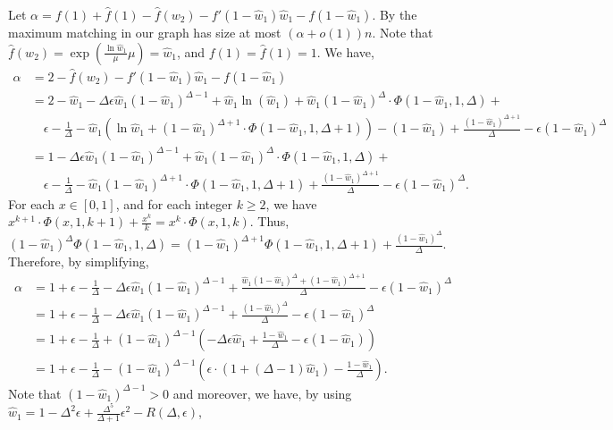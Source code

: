 \documentclass[11pt]{article}
\begin{document}
\begin{appendixproof}
Let $\alpha=f(1)+\hat{f}(1)-\hat{f}(w_2)-f'(1-\hat{w}_1)\hat{w}_1-f(1-\hat{w}_1)$. By  the maximum matching in our graph has size at most $(\alpha+o(1))n$. Note that $\hat{f}(w_2)=\exp\left(\frac{\ln\hat{w}_1}{\mu}\mu\right)=\hat{w}_1$, and $f(1)=\hat{f}(1)=1$. We have,
\begin{align*}
\alpha & = 2 - \hat{f}(w_2) - f'(1-\hat{w}_1)\hat{w}_1 - f(1-\hat{w}_1) \\
& = 2 - \hat{w}_1 - \Delta\epsilon\hat{w}_1(1-\hat{w}_1)^{\Delta-1}+\hat{w}_1\ln(\hat{w}_1) + \hat{w}_1(1-\hat{w}_1)^{\Delta}\cdot \Phi(1-\hat{w}_1,1,\Delta)+\\
&\quad \epsilon-\frac{1}{\Delta} - \hat{w}_1 \left( \ln \hat{w}_1 + (1-\hat{w}_1)^{\Delta+1}\cdot\Phi(1-\hat{w}_1,1,\Delta+1) \right) - (1-\hat{w}_1)+\frac{(1-\hat{w}_1)^{\Delta+1}}{\Delta}-\epsilon(1-\hat{w}_1)^\Delta\\
&=1-\Delta\epsilon\hat{w}_1(1-\hat{w}_1)^{\Delta-1} + \hat{w}_1(1-\hat{w}_1)^{\Delta}\cdot \Phi(1-\hat{w}_1,1,\Delta)+\\
&\quad\epsilon-\frac{1}{\Delta}-\hat{w}_1 (1-\hat{w}_1)^{\Delta+1}\cdot\Phi(1-\hat{w}_1,1,\Delta+1)+\frac{(1-\hat{w}_1)^{\Delta+1}}{\Delta}-\epsilon(1-\hat{w}_1)^\Delta.
\end{align*}
For each $x \in [0,1]$, and for each integer $k \ge 2$, we have $x^{k+1} \cdot \Phi(x,1,k+1) +  \frac{x^k}k= x^k \cdot \Phi(x,1,k)$. Thus, $(1-\hat{w}_1)^{\Delta}\Phi(1-\hat{w}_1,1,\Delta) = (1-\hat{w}_1)^{\Delta+1}\Phi(1-\hat{w}_1,1,\Delta+1) + \frac{(1-\hat{w}_1)^{\Delta}}{\Delta}$. Therefore, by simplifying,
\begin{align*}
\alpha & = 1 + \epsilon - \frac{1}{\Delta} -\Delta\epsilon\hat{w}_1(1-\hat{w}_1)^{\Delta-1} + \frac{\hat{w}_1(1-\hat{w}_1)^\Delta+(1-\hat{w}_1)^{\Delta+1}}{\Delta} - \epsilon(1-\hat{w}_1)^\Delta \\
& = 1 + \epsilon - \frac{1}{\Delta} -\Delta\epsilon\hat{w}_1(1-\hat{w}_1)^{\Delta-1} + \frac{(1-\hat{w}_1)^{\Delta}}{\Delta} - \epsilon(1-\hat{w}_1)^\Delta \\
&=1+\epsilon-\frac{1}{\Delta}+(1-\hat{w}_1)^{\Delta-1}\left(-\Delta\epsilon\hat{w}_1 + \frac{1-\hat{w}_1}{\Delta} - \epsilon(1-\hat{w}_1)\right)\\
&=1 +\epsilon-\frac{1}{\Delta}-(1-\hat{w}_1)^{\Delta-1}\left(\epsilon\cdot(1+(\Delta-1)\hat{w}_1) - \frac{1-\hat{w}_1}{\Delta}\right).
\end{align*}
Note that $(1-\hat{w}_1)^{\Delta-1}>0$ and moreover, we have, by using $\hat{w}_1=1-\Delta^2\epsilon+\frac{\Delta^5}{\Delta+1}\epsilon^2 - R(\Delta,\epsilon)$, 

\end{appendixproof}
\end{document}
